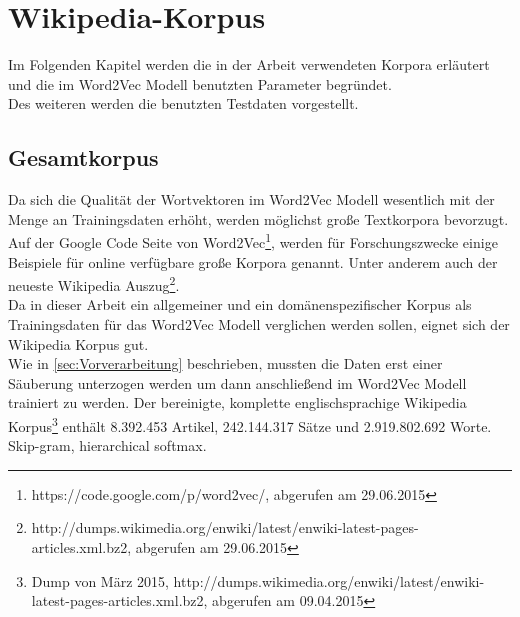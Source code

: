 \documentclass[12pt,a4paper]{report}
\begin{document}
	
	
\newpage
\chapter{Wikipedia-Korpus}
Im Folgenden Kapitel werden die in der Arbeit verwendeten Korpora erläutert und die im Word2Vec Modell benutzten Parameter begründet.\\
Des weiteren werden die benutzten Testdaten vorgestellt.

	\section{Gesamtkorpus}
	\label{sec:Gesamtkorpus}
	Da sich die Qualität  der Wortvektoren im Word2Vec Modell wesentlich mit der Menge an Trainingsdaten erhöht, werden möglichst große Textkorpora bevorzugt. Auf der Google Code Seite von Word2Vec\footnote{https://code.google.com/p/word2vec/, abgerufen am 29.06.2015}, werden für Forschungszwecke einige Beispiele für online verfügbare große Korpora genannt. Unter anderem auch der neueste Wikipedia Auszug\footnote{http://dumps.wikimedia.org/enwiki/latest/enwiki-latest-pages-articles.xml.bz2, abgerufen am 29.06.2015}.\\
	Da in dieser Arbeit ein allgemeiner und ein domänenspezifischer Korpus als Trainingsdaten für das Word2Vec Modell verglichen werden sollen, eignet sich der Wikipedia Korpus gut. \\
	Wie in \ref{sec:Vorverarbeitung} beschrieben, mussten die Daten erst einer Säuberung unterzogen werden um dann anschließend im Word2Vec Modell trainiert zu werden. Der bereinigte, komplette englischsprachige Wikipedia Korpus\footnote{Dump von März 2015, http://dumps.wikimedia.org/enwiki/latest/enwiki-latest-pages-articles.xml.bz2, abgerufen am 09.04.2015} enthält 8.392.453 Artikel, 242.144.317 Sätze und 2.919.802.692 Worte.\\

Skip-gram, hierarchical softmax.\\
\end{document}
